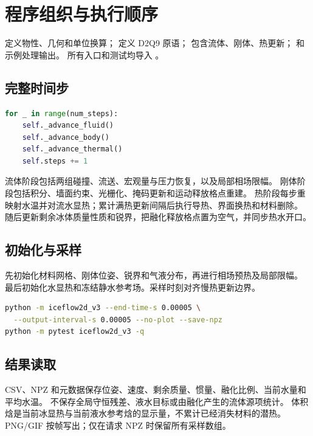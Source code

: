 \section{程序组织与执行顺序}
\label{sec:program}
 定义物性、几何和单位换算； 定义 D2Q9 原语；
 包含流体、刚体、热更新； 和示例处理输出。
所有入口和测试均导入 。

\subsection{完整时间步}
\begin{lstlisting}[language=Python]
for _ in range(num_steps):
    self._advance_fluid()
    self._advance_body()
    self._advance_thermal()
    self.steps += 1
\end{lstlisting}
流体阶段包括两组碰撞、流送、宏观量与压力恢复，以及局部相场限幅。
刚体阶段包括积分、墙面约束、光栅化、掩码更新和运动释放格点重建。
热阶段每步重映射水温并对流水显热；累计满热更新间隔后执行导热、界面换热和材料删除。
随后更新剩余冰体质量性质和锐界，把融化释放格点置为空气，并同步热水开口。

\subsection{初始化与采样}
先初始化材料网格、刚体位姿、锐界和气液分布，再进行相场预热及局部限幅。
最后初始化水显热和冻结静水参考场。采样时刻对齐慢热更新边界。
\begin{lstlisting}[language=bash]
python -m iceflow2d_v3 --end-time-s 0.00005 \
  --output-interval-s 0.00005 --no-plot --save-npz
python -m pytest iceflow2d_v3 -q
\end{lstlisting}

\subsection{结果读取}
CSV、NPZ 和元数据保存位姿、速度、剩余质量、惯量、融化比例、当前水量和平均水温。
不保存全局守恒残差、液水目标或由融化产生的流体源项统计。
体积焓是当前冰显热与当前液水参考焓的显示量，不累计已经消失材料的潜热。
PNG/GIF 按帧写出；仅在请求 NPZ 时保留所有采样数组。
